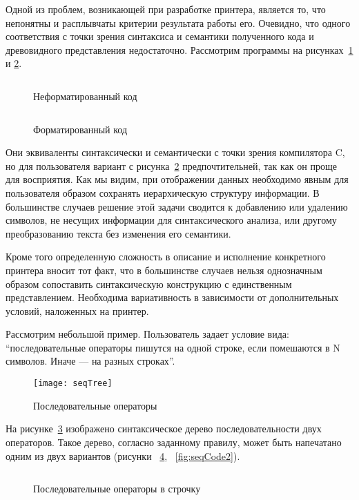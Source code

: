 Одной из проблем, возникающей при разработке принтера, является то, что непонятны и расплывчаты критерии результата работы его.
Очевидно, что одного соответствия с точки зрения синтаксиса и семантики полученного кода и древовидного представления недостаточно. Рассмотрим программы на рисунках~\ref{fig:wikiExUnfor} и \ref{fig:wikiExBSD}.

\begin{figure}[h!]
	\centering
	\inputminted{c}{codes/wikiExUnfor.c}
	\caption{Неформатированный код}
	\label{fig:wikiExUnfor}
\end{figure}

\begin{figure}[h!]
	\centering
	\inputminted{c}{codes/wikiExBSD.c}
	\caption{Форматированный код}
	\label{fig:wikiExBSD}
\end{figure}

Они эквиваленты синтаксически и семантически с точки зрения компилятора C, но для пользователя вариант с рисунка~\ref{fig:wikiExBSD} предпочтительней, так как он проще для восприятия. Как мы видим, при отображении данных необходимо явным для пользователя образом сохранять иерархическую структуру информации. В большинстве случаев решение этой задачи сводится к добавлению или удалению символов, не несущих информации для синтаксического анализа, или другому преобразованию текста без изменения его семантики.

Кроме того определенную сложность в описание и исполнение конкретного принтера вносит тот факт, что в большинстве случаев нельзя однозначным образом сопоставить синтаксическую конструкцию с единственным представлением. Необходима вариативность в зависимости от дополнительных условий, наложенных на принтер.

Рассмотрим небольшой пример. Пользователь задает условие вида: “последовательные операторы пишутся на одной строке, если помешаются в N символов. Иначе --- на разных строках”.

\begin{figure}[h]
	\centering
	\texttt{[image: seqTree]}
	\caption{Последовательные операторы}
	\label{fig:seqImage}
\end{figure}

На рисунке~\ref{fig:seqImage} изображено синтаксическое дерево последовательности двух операторов. Такое дерево, согласно заданному правилу, может быть напечатано одним из двух вариантов (рисунки ~\ref{fig:seqCode1}, ~\ref{fig:seqCode2}).

\begin{figure}[h]
	\inputminted{c}{codes/seqCode1.java}
	\caption{Последовательные операторы в строчку}
	\label{fig:seqCode1}
\end{figure}

